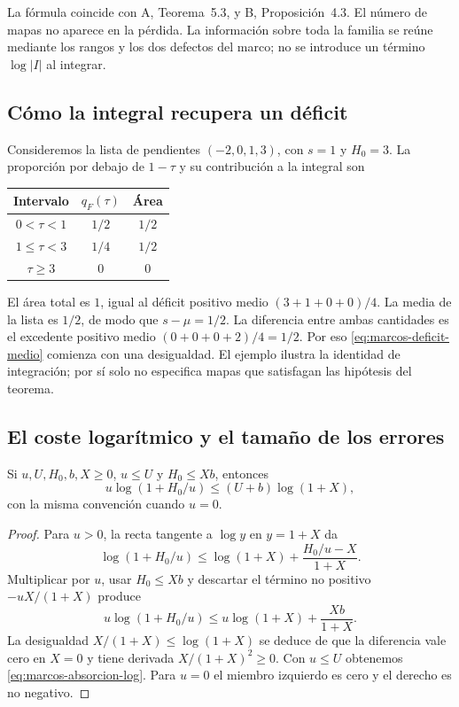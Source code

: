 La fórmula coincide con A, Teorema~5.3, y B, Proposición~4.3.
El número de mapas no aparece en la pérdida. La información sobre
toda la familia se reúne mediante los rangos y los dos defectos del
marco; no se introduce un término $\log|I|$ al integrar.

\subsection{Cómo la integral recupera un déficit}

Consideremos la lista de pendientes $(-2,0,1,3)$, con $s=1$ y
$H_0=3$. La proporción por debajo de $1-\tau$ y su contribución
a la integral son
\begin{center}
\begin{tabular}{@{}ccc@{}}
\toprule
Intervalo & $q_F(\tau)$ & Área \\
\midrule
$0<\tau<1$ & $1/2$ & $1/2$ \\
$1\le\tau<3$ & $1/4$ & $1/2$ \\
$\tau\ge3$ & $0$ & $0$ \\
\bottomrule
\end{tabular}
\end{center}
El área total es $1$, igual al déficit positivo medio
$(3+1+0+0)/4$. La media de la lista es $1/2$, de modo que
$s-\mu=1/2$. La diferencia entre ambas cantidades es el excedente
positivo medio $(0+0+0+2)/4=1/2$. Por eso
\eqref{eq:marcos-deficit-medio} comienza con una desigualdad.
El ejemplo ilustra la identidad de integración; por sí solo no
especifica mapas que satisfagan las hipótesis del teorema.

\subsection{El coste logarítmico y el tamaño de los errores}

\begin{lema}
Si $u,U,H_0,b,X\ge0$, $u\le U$ y $H_0\le Xb$, entonces
\begin{equation}
 u\log(1+H_0/u)\le(U+b)\log(1+X),
 \label{eq:marcos-absorcion-log}
\end{equation}
con la misma convención cuando $u=0$.
\end{lema}

\begin{proof}
Para $u>0$, la recta tangente a $\log y$ en $y=1+X$ da
\[
 \log(1+H_0/u)
 \le\log(1+X)+\frac{H_0/u-X}{1+X}.
\]
Multiplicar por $u$, usar $H_0\le Xb$ y descartar el término
no positivo $-uX/(1+X)$ produce
\[
 u\log(1+H_0/u)
 \le u\log(1+X)+\frac{Xb}{1+X}.
\]
La desigualdad $X/(1+X)\le\log(1+X)$ se deduce de que
la diferencia vale cero en $X=0$ y tiene derivada
$X/(1+X)^2\ge0$. Con $u\le U$ obtenemos
\eqref{eq:marcos-absorcion-log}. Para $u=0$ el miembro izquierdo
es cero y el derecho es no negativo.
\end{proof}


